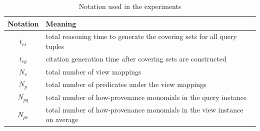\begin{table}
\centering
\caption{Notation used in the experiments}
\small
\begin{tabular}[!h]{|c|>{\centering\arraybackslash}p{6.8cm}|} \hline
Notation & Meaning \\ \hline
$t_{cs}$&total reasoning time to generate the covering sets for all query tuples \\ \hline
$t_{cg}$&citation generation time after covering sets are constructed \\ \hline
$N_v$&total number of view mappings \\ \hline
$N_p$&total number of predicates under the view mappings \\ \hline
$N_{pq}$&total number of how-provenance monomials in the query instance \\ \hline
$N_{pv}$&total number of how-provenance monomials in the view instance on average\\ \hline
\end{tabular}
\label{Table: notation_summary}
\end{table}

